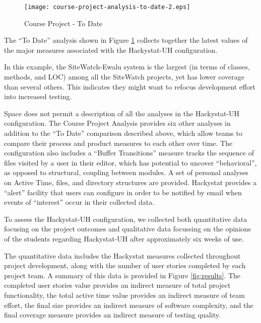 \documentclass[10pt,twocolumn]{article}
\begin{document}
\begin{figure}[ht]
  \centering
  \texttt{[image: course-project-analysis-to-date-2.eps]}
  \caption{Course Project - To Date}
  \label{fig:course-project-analysis-to-date}
\end{figure}

The ``To Date'' analysis shown in Figure
\ref{fig:course-project-analysis-to-date} collects together the latest
values of the major measures associated with the Hackystat-UH
configuration.

In this example, the SiteWatch-Ewalu system is the largest (in terms of
classes, methods, and LOC) among all the SiteWatch projects, yet has lower
coverage than several others. This indicates they might want to refocus
development effort into increased testing.


Space does not permit a description of all the analyses in the Hackystat-UH
configuration.  The Course Project Analysis provides six other analyses in
addition to the ``To Date'' comparison described above, which allow teams
to compare their process and product measures to each other over time. The
configuration also includes a ``Buffer Transitions'' measure tracks the
sequence of files visited by a user in their editor, which has potential to
uncover ``behavioral'', as opposed to structural, coupling between modules.
A set of personal analyses on Active Time, files, and directory structures
are provided. Hackystat provides a ``alert'' facility that users can
configure in order to be notified by email when events of ``interest''
occur in their collected data.

\label{sec:results}

To assess the Hackystat-UH configuration, we collected both quantitative
data focusing on the project outcomes and qualitative data focussing on
the opinions of the students regarding Hackystat-UH after approximately six
weeks of use.


The quantitative data includes the Hackystat measures collected throughout
project development, along with the number of user stories completed by
each project team.  A summary of this data is provided in Figure
\ref{fig:results}.  The completed user stories value provides an indirect
measure of total project functionality, the total active time value
provides an indirect measure of team effort, the final size provides an
indirect measure of software complexity, and the final coverage measure
provides an indirect measure of testing quality.
\end{document}
